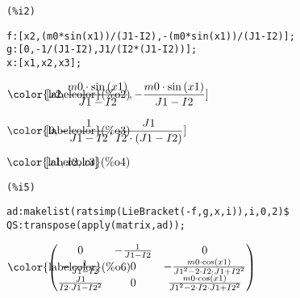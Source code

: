 \noindent
\begin{minipage}[t]{8ex}
\color{red}\bf
\begin{verbatim}
(%i2) 
\end{verbatim}
\end{minipage}
\begin{minipage}[t]{\textwidth}
\color{blue}
\begin{verbatim}
f:[x2,(m0*sin(x1))/(J1-I2),-(m0*sin(x1))/(J1-I2)];
g:[0,-1/(J1-I2),J1/(I2*(J1-I2))];
x:[x1,x2,x3];
\end{verbatim}
\end{minipage}


\noindent
\begin{math}\displaystyle
\parbox{8ex}{\color{labelcolor}(\%o2) }
[x2,\frac{m0\cdot \mathrm{sin}\left( x1\right) }{J1-I2},-\frac{m0\cdot \mathrm{sin}\left( x1\right) }{J1-I2}]\end{math}

\noindent
\begin{math}\displaystyle
\parbox{8ex}{\color{labelcolor}(\%o3) }
[0,-\frac{1}{J1-I2},\frac{J1}{I2\cdot \left( J1-I2\right) }]\end{math}

\noindent
\begin{math}\displaystyle
\parbox{8ex}{\color{labelcolor}(\%o4) }
[x1,x2,x3]\mbox{}
\end{math}


\noindent
\begin{minipage}[t]{8ex}
\color{red}\bf
\begin{verbatim}
(%i5) 
\end{verbatim}
\end{minipage}
\begin{minipage}[t]{\textwidth}
\color{blue}
\begin{verbatim}
ad:makelist(ratsimp(LieBracket(-f,g,x,i)),i,0,2)$
QS:transpose(apply(matrix,ad));
\end{verbatim}
\end{minipage}

\noindent
\begin{math}\displaystyle
\parbox{8ex}{\color{labelcolor}(\%o6) }
\begin{pmatrix}0 & -\frac{1}{J1-I2} & 0\cr -\frac{1}{J1-I2} & 0 & -\frac{m0\cdot \mathrm{cos}\left( x1\right) }{{{J1}^{2}}-2\cdot I2\cdot J1+{{I2}^{2}}}\cr \frac{J1}{I2\cdot J1-{{I2}^{2}}} & 0 & \frac{m0\cdot \mathrm{cos}\left( x1\right) }{{{J1}^{2}}-2\cdot I2\cdot J1+{{I2}^{2}}}\end{pmatrix}\mbox{}
\end{math}


